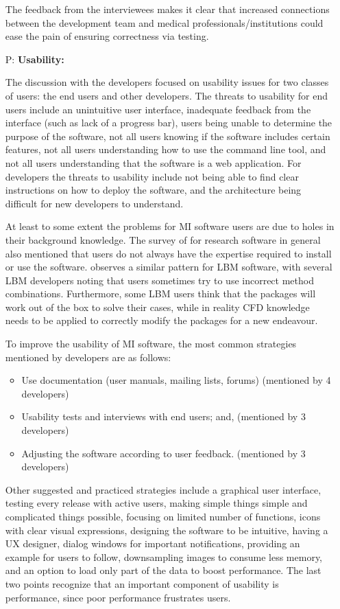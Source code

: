 \documentclass[final, 3p, times, authoryear]{elsarticle}
\newcounter{pnum} %
\begin{document}
\begin{enumerate}
The feedback from the interviewees makes it clear that increased connections
between the development team and medical professionals/institutions could ease
the pain of ensuring correctness via testing.

\item[P\refstepcounter{pnum}\thepnum \label{P_Usability}:]
\textbf{Usability:}  

The discussion with the developers focused on usability issues for two classes
of users: the end users and other developers.  The threats to usability for end
users include an unintuitive user interface, inadequate feedback from the
interface (such as lack of a progress bar), users being unable to determine the purpose of
the software, not all users knowing if the software includes certain features, not
all users understanding how to use the command line tool, and not all users
understanding that the software is a web application. For developers the threats to
usability include not being able to find clear instructions on how to deploy the
software, and the architecture being difficult for new developers to understand.

At least to some extent the problems for MI software users are due to holes in
their background knowledge.  The survey of \citet{WieseEtAl2019} for research
software in general also mentioned that users do not always have the expertise
required to install or use the software. \citet{SmithEtAl2022} observes a
similar pattern for LBM software, with several LBM developers noting that users
sometimes try to use incorrect method combinations. Furthermore, some LBM users
think that the packages will work out of the box to solve their cases, while in
reality CFD knowledge needs to be applied to correctly modify the packages for a
new endeavour.

To improve the usability of MI software, the most common strategies mentioned by
developers are as follows:

\begin{itemize}
    \item Use documentation (user manuals, mailing lists, forums) (mentioned by
    4 developers)
    \item Usability tests and interviews with end users; and, (mentioned by 3
    developers)
    \item Adjusting the software according to user feedback. (mentioned by 3
    developers)
\end{itemize}

Other suggested and practiced strategies include a graphical user interface,
testing every release with active users, making simple things simple and
complicated things possible, focusing on limited number of functions, icons with
clear visual expressions, designing the software to be intuitive, having a UX
designer, dialog windows for important notifications, providing an example for
users to follow, downsampling images to consume less memory, and an option to
load only part of the data to boost performance.  The last two points recognize
that an important component of usability is performance, since poor performance
frustrates users.

\end{enumerate}
\end{document}
